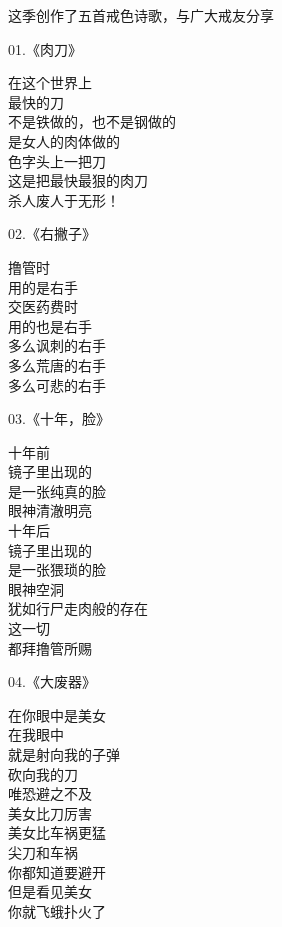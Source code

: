 \documentclass{ctexart}
\begin{document}
这季创作了五首戒色诗歌，与广大戒友分享

\begin{multicols}{2}
    \begin{center}
        01.《肉刀》\it

        在这个世界上 \\ 最快的刀 \\ 不是铁做的，也不是钢做的 \\ 是女人的肉体做的 \\ 色字头上一把刀 \\ 这是把最快最狠的肉刀 \\ 杀人废人于无形！
    \end{center}

    \begin{center}
        02.《右撇子》\it

        撸管时 \\ 用的是右手 \\ 交医药费时 \\ 用的也是右手 \\ 多么讽刺的右手 \\ 多么荒唐的右手 \\ 多么可悲的右手
    \end{center}

    \begin{center}
        03.《十年，脸》\it

        十年前 \\ 镜子里出现的 \\ 是一张纯真的脸 \\ 眼神清澈明亮 \\ 十年后 \\ 镜子里出现的 \\ 是一张猥琐的脸 \\ 眼神空洞 \\ 犹如行尸走肉般的存在 \\ 这一切 \\ 都拜撸管所赐
    \end{center}

    \begin{center}
        04.《大废器》\it

        在你眼中是美女 \\ 在我眼中 \\ 就是射向我的子弹 \\ 砍向我的刀 \\ 唯恐避之不及 \\ 美女比刀厉害 \\ 美女比车祸更猛 \\ 尖刀和车祸 \\ 你都知道要避开 \\ 但是看见美女 \\ 你就飞蛾扑火了
    \end{center}


\end{multicols}
\end{document}

